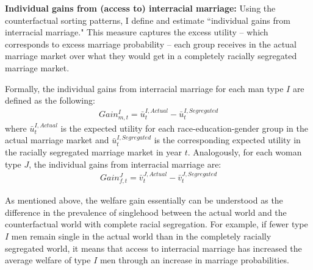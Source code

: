 \vspace{4mm}

\noindent \textbf{Individual gains from (access to) interracial marriage:} Using the counterfactual sorting patterns, I define and estimate ``individual gains from interracial marriage." This measure captures the excess utility -- which corresponds to excess marriage probability -- each group receives in the actual marriage market over what they would get in a completely racially segregated marriage market. 

 Formally, the individual gains from interracial marriage  for each man type $I$ are defined as the following:
\begin{align}
	Gain^{I}_{m,t} = \bar{u}^{I, Actual}_t - \bar{u}^{I, Segregated}_t  \label{eq:gIm}
\end{align}
where $\bar{u}^{I, Actual}_t$ is the expected utility for each race-education-gender group in the actual marriage market and $\bar{u}^{I, Segregated}_t$ is the corresponding expected utility in the racially segregated marriage market in year $t$. Analogously, for each woman type $J$, the individual gains from interracial marriage are:
\begin{align}
	Gain^{J}_{f,t} = \bar{v}^{J, Actual}_t - \bar{v}^{J, Segregated}_t\label{eq:gJf}
\end{align}

\noindent As mentioned above, the welfare gain essentially can be understood as the difference in the prevalence of singlehood between the actual world and the counterfactual world with complete racial segregation. For example, if fewer type $I$ men remain single in the actual world than in the completely racially segregated world, it means that access to interracial marriage has increased the average welfare of type $I$ men through an increase in marriage probabilities.


